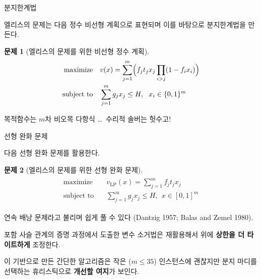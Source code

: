 \documentclass[10pt,slidestop,compress,mathserif,notheorems]{beamer}
\newif\ifen
\theoremstyle{definition}
\newtheorem{problem}{Problem}
\theoremstyle{definition}
\newtheorem{problem}{문제}
\begin{document}
\begin{frame}{\ifen Branch-and-bound\else 분지한계법\fi}
\ifen
Our branch-and-bound framework is based on the following integer formulation of Ellis's problem. 
\else
엘리스의 문제는 다음 정수 비선형 계획으로 표현되며 이를 바탕으로 분지한계법을 만든다. 
\fi
\begin{problem}[\ifen Integer NLP for Ellis's problem\else 엘리스의 문제를 위한 비선형 정수 계획\fi]%
\vspace{-1em}
\begin{align*}
\begin{split}
\text{maximize}\quad &  v(x) = \sum_{j=1}^m \Bigl(f_j t_j  x_j \prod_{i > j} (1 - f_{i} x_i) \Bigr)\\
\text{subject to}\quad & \sum_{j=1}^m g_j x_j \leq H, ~~ x_i \in \{0, 1\}^m
\end{split}
\end{align*}
\end{problem}

\ifen
Objective is a nonconvex polynomial of degree $m$ \dots~numerical solvers are hopeless!
\else
목적함수는 $m$차 비오목 다항식 \dots~수리적 솔버는 헛수고!
\fi
\end{frame}






\begin{frame}{\ifen LP relaxation \else 선형 완화 문제\fi}
\ifen 
We use the following LP upper bound.
\else
다음 선형 완화 문제를 활용한다.
\fi
\begin{problem}[\ifen LP relaxation for Ellis's problem\else 엘리스의 문제를 위한 선형 완화 문제\fi] %
\vspace{-1em}
\begin{align*}
\begin{split}
\text{maximize}\quad &  v_{\mathrm{LP}}(x) = \sum_{j=1}^m  f_j t_j x_j \\
\text{subject to}\quad & \sum_{j=1}^m g_j x_j \leq H, ~~ x \in [0, 1]^m
\end{split}
\end{align*}
\end{problem}
\ifen
This is a continuous knapsack problem, easy to solve (Dantzig 1957; Balas and Zemel 1980). 

We \textbf{tighten this bound} by recycling a variable-elimination technique from the proof of the nestedness theorem.

A straightforward implementation is OK on small instances ($m \leq 35$). \textbf{Considerable room for improvement} by using better heuristics to select the branch node.
\else
연속 배낭 문제라고 불리며 쉽게 풀 수 있다 (Dantzig 1957; Balas and Zemel 1980). 

포함 사슬 관계의 증명 과정에서 도출한 변수 소거법은 재활용해서 위에 \textbf{상한을 더 타이트하게} 조정한다.

이 기반으로 만든 간단한 알고리즘은 작은 ($m \leq 35$) 인스턴스에 괜찮지만 분지 마디를 선택하는 휴리스틱으로 \textbf{개선할 여지}가 보인다.
\fi
\end{frame}
\end{document}
